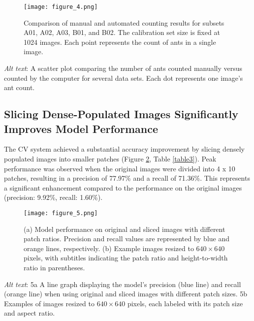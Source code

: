 \begin{figure}[H]
    \centering
    \texttt{[image: figure\_4.png]}
    \caption{Comparison of manual and automated counting results for subsets A01, A02, A03, B01, and B02. The calibration set size is fixed at 1024 images. Each point represents the count of ants in a single image.}
    \label{fig:figure4}
\end{figure}

\textit{Alt text}: A scatter plot comparing the number of ants counted manually versus counted by the computer for several data sets. Each dot represents one image's ant count.

\subsection{Slicing Dense-Populated Images Significantly Improves Model Performance}

The CV system achieved a substantial accuracy improvement by slicing densely populated images into smaller patches (Figure \ref{fig:figure5}, Table \ref{table3}). Peak performance was observed when the original images were divided into 4 x 10 patches, resulting in a precision of 77.97\% and a recall of 71.36\%. This represents a significant enhancement compared to the performance on the original images (precision: 9.92\%, recall: 1.60\%).

\begin{figure}[H]
    \centering
    \texttt{[image: figure\_5.png]}
    \caption{(a) Model performance on original and sliced images with different patch ratios. Precision and recall values are represented by blue and orange lines, respectively. (b) Example images resized to $640 \times 640$ pixels, with subtitles indicating the patch ratio and height-to-width ratio in parentheses.}
    \label{fig:figure5}
\end{figure}

\textit{Alt text}: 5a A line graph displaying the model's precision (blue line) and recall (orange line) when using original and sliced images with different patch sizes. 5b Examples of images resized to $640 \times 640$ pixels, each labeled with its patch size and aspect ratio.

